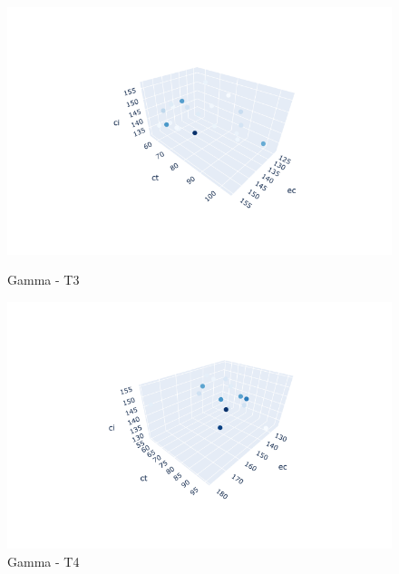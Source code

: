 \documentclass{hust}
\begin{document}
\begin{itemize}
	\begin{figure}[H]
		\begin{minipage}{0.5\textwidth}
			\centering
			\includegraphics[width=1.2\linewidth]{images/ga-dem3.png}
			\caption{Gamma - T3}\label{fig:nsga-ii-ga-dem3}
		\end{minipage}\hfill
		\begin{minipage}{0.5\textwidth}
			\centering
			\includegraphics[width=1.2\linewidth]{images/ga-dem4.png}
			\caption{Gamma - T4}\label{fig:nsga-ii-ga-dem4}
		\end{minipage}
	\end{figure}


\end{itemize}
\end{document}
